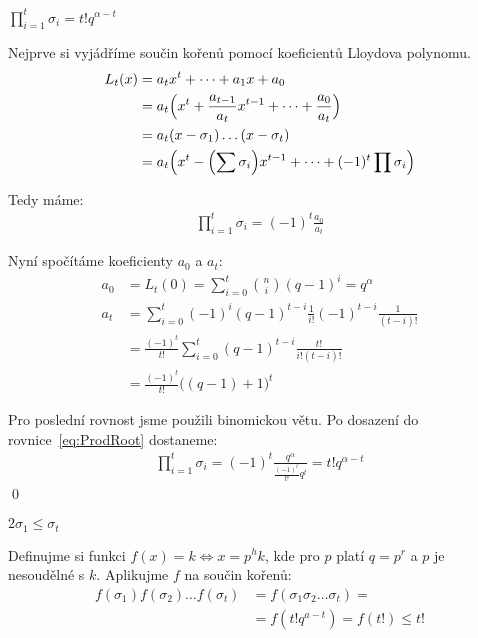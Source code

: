 \lm $\prod\limits_{i = 1}^{t} \sigma_i = t!q^{\alpha - t}$

\dk Nejprve si vyjádříme součin kořenů pomocí koeficientů Lloydova polynomu.
\begin{align*}
L_t(x) &= a_t x^t + \dots + a_1x + a_0 \\
&= a_t \Bigl(x^t + \frac{a_{t-1}}{a_t}x^{t-1} + \dots + \frac{a_0}{a_t}\Bigr) \\
&= a_t (x - \sigma_1)\dots(x - \sigma_t) \\
&= a_t\Bigl(x^t - \Bigl(\sum \sigma_i\Bigr)x^{t-1} + \dots + (-1)^t \prod \sigma_i\Bigr)
\end{align*}

Tedy máme:
\begin{align}
\prod\limits_{i = 1}^{t} \sigma_i = (-1)^t \frac{a_0}{a_t} \label{eq:ProdRoot}
\end{align}

Nyní spočítáme koeficienty $a_0$ a $a_t$:
\begin{align*}
a_0 &= L_t(0) = \sum\limits_{i = 0}^{t} {n \choose i}(q - 1)^i = q^\alpha \\
a_t &= \sum\limits_{i = 0}^{t} (-1)^i (q - 1)^{t - i} \frac{1}{i!}(-1)^{t-i} \frac{1}{(t-i)!} \\
&= \frac{(-1)^t}{t!}\sum\limits_{i = 0}^{t}(q-1)^{t-i} \frac{t!}{i!(t-i)!} \\
&= \frac{(-1)^t}{t!}\bigl((q - 1) + 1\bigr)^t
\end{align*}

Pro poslední rovnost jsme použili binomickou větu. Po dosazení do rovnice~\ref{eq:ProdRoot} dostaneme:
\begin{align*}
\prod\limits_{i = 1}^{t} \sigma_i = (-1)^t \frac{q^\alpha}{\frac{(-1)^t}{t!}q^t} = t!q^{\alpha-t}
\end{align*}
\qed

\lm $2 \sigma_1 \leq \sigma_t$

\dk Definujme si funkci $f(x) = k \Leftrightarrow x = p^hk$, kde pro $p$ platí $q = p^r$ a $p$ je nesoudělné s $k$. Aplikujme $f$ na součin kořenů:
\begin{align*}
f(\sigma_1)f(\sigma_2) \dots f(\sigma_t) &= f(\sigma_1\sigma_2 \dots \sigma_t) =\\
&= f(t!q^{a-t}) = f(t!) \leq t!
\end{align*}

